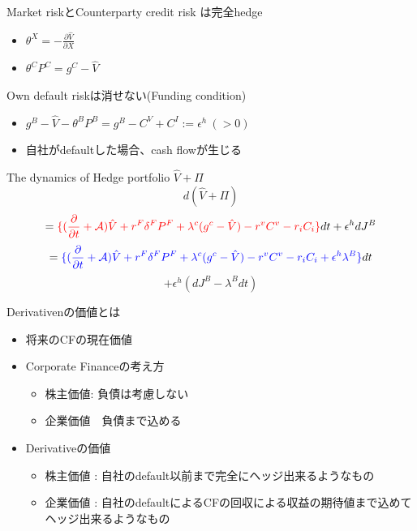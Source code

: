 \documentclass[driverfallback=dvipdfmx,cjk]{beamer}
\begin{document}
\begin{frame}
    Market riskとCounterparty credit risk は完全hedge
    \begin{itemize}
        \item $\theta^X = -\frac{ \partial \hat{V}}{\partial X}$
        \item $ \theta^CP^C = g^C - \hat{V} $ 
    \end{itemize}

    Own default riskは消せない(Funding condition)
    \begin{itemize}
        \item $g^B - \hat{V} -\theta^B P^B = g^B - C^V + C^I := \epsilon^h \ (>0)$
        \item 自社がdefaultした場合、cash flowが生じる
    \end{itemize}
The dynamics of Hedge portfolio $\hat{V} + \Pi$
$$ d (\hat{V} + \Pi)$$ 
$$=\textcolor{red}{\{ (\frac{\partial }{ \partial t} + \mathcal{A}) \hat{V} + r^F\delta^FP^F + \lambda^c(g^c - \hat{V}) -r^vC^v - r_iC_i \}}dt + \epsilon^h dJ^B $$
$$=\textcolor{blue}{\{ (\frac{\partial }{ \partial t} + \mathcal{A}) \hat{V} + r^F\delta^FP^F + \lambda^c(g^c - \hat{V}) -r^vC^v - r_iC_i + \epsilon^h \lambda^B\}}dt$$ $$+ \epsilon^h  (dJ^B - \lambda^B dt) $$
\end{frame}

\begin{frame}
    Derivativenの価値とは
    \begin{itemize}
        \item 将来のCFの現在価値
        \item Corporate Financeの考え方
        \begin{itemize}
            \item 株主価値: 負債は考慮しない
            \item 企業価値　負債まで込める
        \end{itemize}
        \item Derivativeの価値
        \begin{itemize}
            \item 株主価値 : 自社のdefault以前まで完全にヘッジ出来るようなもの
            \item 企業価値 : 自社のdefaultによるCFの回収による収益の期待値まで込めてヘッジ出来るようなもの
        \end{itemize}
    \end{itemize}
\end{frame}
\end{document}
